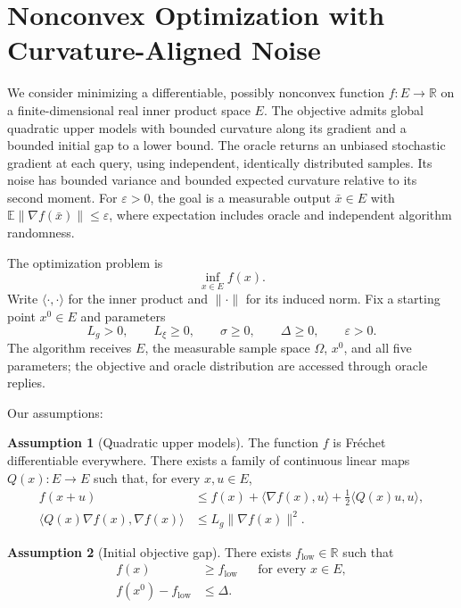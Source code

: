\documentclass[10pt]{article}
\theoremstyle{definition}
\newtheorem{assumption}{Assumption}
\begin{document}
\section*{Nonconvex Optimization with Curvature-Aligned Noise}
We consider minimizing a differentiable, possibly nonconvex function $f:E\to\mathbb{R}$ on a finite-dimensional real inner product space $E$. The objective admits global quadratic upper models with bounded curvature along its gradient and a bounded initial gap to a lower bound. The oracle returns an unbiased stochastic gradient at each query, using independent, identically distributed samples. Its noise has bounded variance and bounded expected curvature relative to its second moment. For $\varepsilon>0$, the goal is a measurable output $\bar{x}\in E$ with $\mathbb{E}\|\nabla f(\bar{x})\|\leq\varepsilon$, where expectation includes oracle and independent algorithm randomness.

The optimization problem is
\[
\inf_{x\in E} f(x).
\]
Write $\langle\cdot,\cdot\rangle$ for the inner product and $\|\cdot\|$ for its induced norm. Fix a starting point $x^0\in E$ and parameters
\[
L_g>0,\qquad L_\xi\geq0,\qquad \sigma\geq0,\qquad
\Delta\geq0,\qquad \varepsilon>0.
\]
The algorithm receives $E$, the measurable sample space $\Omega$, $x^0$, and all five parameters; the objective and oracle distribution are accessed through oracle replies.

Our assumptions:
\begin{assumption}[Quadratic upper models]
The function $f$ is Fr\'echet differentiable everywhere. There exists a family of continuous linear maps $Q(x):E\to E$ such that, for every $x,u\in E$,
\[
\begin{aligned}
f(x+u)&\leq f(x)+\langle\nabla f(x),u\rangle
+\tfrac12\langle Q(x)u,u\rangle,\\
\langle Q(x)\nabla f(x),\nabla f(x)\rangle
&\leq L_g\|\nabla f(x)\|^2.
\end{aligned}
\]
\end{assumption}

\begin{assumption}[Initial objective gap]
There exists $f_{\mathrm{low}}\in\mathbb{R}$ such that
\[
\begin{aligned}
f(x)&\geq f_{\mathrm{low}} &&\text{for every }x\in E,\\
f(x^0)-f_{\mathrm{low}}&\leq\Delta.
\end{aligned}
\]
\end{assumption}
\end{document}
